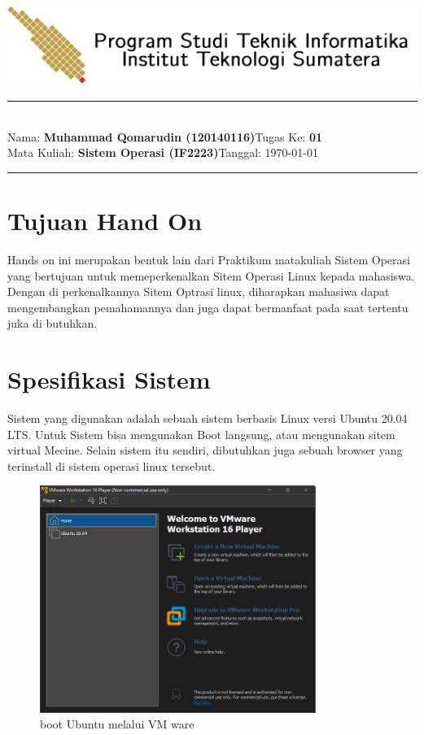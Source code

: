 \documentclass[11pt,a4paper]{article}
\newcommand{\stuid}{120140116}
\newcommand{\student}{\textbf{Muhammad Qomarudin (\stuid{})}}
\newcommand{\course}{\textbf{Sistem Operasi (IF2223)}}
\newcommand{\assignment}{\textbf{01}} %
\begin{document}
\thispagestyle{empty}
\begin{center}
	\includegraphics[scale = 0.15]{Figure/ifitera-header.png}
	\vspace{0.1cm}
\end{center}
\noindent
{\large
\rule{17cm}{0.2cm}\\[0.3cm]
Nama: \student \hfill Tugas Ke: \assignment\\[0.1cm]
Mata Kuliah: \course \hfill Tanggal: \today\\
\rule{17cm}{0.05cm}
\vspace{0.1cm}
}



\section{Tujuan Hand On}
	Hands on ini merupakan bentuk lain dari Praktikum matakuliah Sistem Operasi yang bertujuan untuk
	memeperkenalkan Sitem Operasi Linux kepada mahasiswa.
	Dengan di perkenalkannya Sitem Optrasi linux,
	diharapkan mahasiwa dapat mengembangkan pemahamannya dan juga dapat bermanfaat pada saat tertentu juka di butuhkan.

\section{Spesifikasi Sistem}
    Sistem yang digunakan adalah sebuah sistem berbasis Linux versi Ubuntu 20.04 LTS. Untuk Sistem bisa mengunakan Boot langsung, atau mengunakan sitem virtual Mecine. 
	Selain sistem itu sendiri, dibutuhkan juga sebuah browser yang terinstall di sistem operasi linux tersebut.
	\begin{figure}[h]
		\centering
		\includegraphics[width=0.8\textwidth]{figure/VM ware.png}
		\caption{boot Ubuntu melalui VM ware}
	\end{figure}
 
\end{document}
